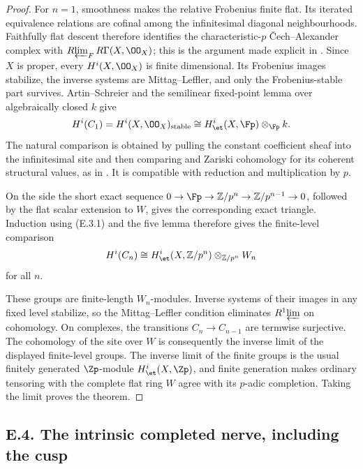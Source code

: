 \begin{proof}
For $n=1$, smoothness makes the relative Frobenius finite flat.  Its iterated equivalence relations are cofinal among the infinitesimal diagonal neighbourhoods.  Faithfully flat descent therefore identifies the characteristic-$p$ \v Cech--Alexander complex with $R\!\varprojlim_F R\Gamma(X,\OO_X)$; this is the argument made explicit in \cite[Remark~4.12]{Ogus1975}.  Since $X$ is proper, every $H^i(X,\OO_X)$ is finite dimensional.  Its Frobenius images stabilize, the inverse systems are Mittag--Leffler, and only the Frobenius-stable part survives.  Artin--Schreier and the semilinear fixed-point lemma over algebraically closed $k$ give
\[
 H^i(C_1)=H^i(X,\OO_X)_{\mathrm{stable}}
     \cong H^i_{\et}(X,\Fp)\otimes_{\Fp}k.
\]
The natural comparison is obtained by pulling the constant coefficient sheaf into the \etale infinitesimal site and then comparing \etale and Zariski cohomology for its coherent structural values, as in \cite[Propositions~1.8 and~1.13]{Ogus1975}.  It is compatible with reduction and multiplication by $p$.

On the \etale side the short exact sequence
$0\to\Fp\to\mathbb Z/p^n\to\mathbb Z/p^{n-1}\to0$, followed by the flat scalar extension to $W$, gives the corresponding exact triangle.  Induction using (E.3.1) and the five lemma therefore gives the finite-level comparison
\[
 H^i(C_n)\cong H^i_{\et}(X,\mathbb Z/p^n)\otimes_{\mathbb Z/p^n}W_n
\]
for all $n$.

These groups are finite-length $W_n$-modules.  Inverse systems of their images in any fixed level stabilize, so the Mittag--Leffler condition eliminates $R^1\!\varprojlim$ on cohomology.  On complexes, the transitions $C_n\to C_{n-1}$ are termwise surjective.  The cohomology of the site over $W$ is consequently the inverse limit of the displayed finite-level groups.  The inverse limit of the finite \etale groups is the usual finitely generated $\Zp$-module $H^i_{\et}(X,\Zp)$, and finite generation makes ordinary tensoring with the complete flat ring $W$ agree with its $p$-adic completion.  Taking the limit proves the theorem.
\end{proof}

\subsection{E.4. The intrinsic completed nerve, including the cusp}

